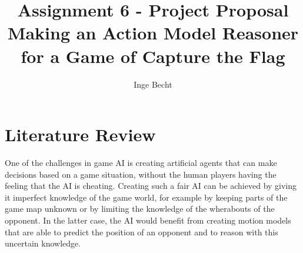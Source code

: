\documentclass[a4paper, 12pt]{article}
\author{Inge Becht}
\title{Assignment 6 - Project Proposal\\ 
 Making an Action Model Reasoner for a Game of Capture the Flag}
\begin{document}
\maketitle

\section{Literature Review}
One of the challenges in game AI is creating artificial agents that can make
decisions based on a game situation, without the human players having the
feeling that the AI is cheating. Creating such a fair AI can be achieved by
giving it imperfect knowledge of the game world, for example by keeping parts of
the game map unknown or by limiting the knowledge of the wherabouts of the
opponent. In the latter case, the AI would benefit from creating motion models that
are able to predict the position of an opponent and to
reason with this uncertain knowledge.
\end{document}
